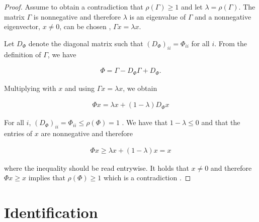 \documentclass[accepted]{uai2021} %
\begin{document}
\begin{proof}
	Assume to obtain a contradiction that $\rho(\Gamma) \geq 1$ and let 
	$\lambda = \rho(\Gamma)$. The matrix $\Gamma$ is nonnegative and therefore 
	$\lambda$ is an eigenvalue of $\Gamma$ and a nonnegative eigenvector, $x 
	\neq 0$, 
	can be chosen \citep[Theorem 8.3.1]{horn1985}, $\Gamma x = \lambda x$.
	
	Let $D_\Phi$ denote the diagonal matrix such that $(D_{\Phi})_{ii} = 
	\Phi_{ii}$ for all $i$. From the definition of $\Gamma$, we have
	
	\begin{align*}
		\Phi= \Gamma - D_\Phi\Gamma + D_\Phi.
	\end{align*}
	
	Multiplying with $x$ and using $\Gamma x = \lambda x$, we obtain
	
	\begin{align*}
		\Phi x = \lambda x + (1- \lambda)D_\Phi x
	\end{align*}
	
	For all $i$, $(D_\Phi)_{ii} = \Phi_{ii}\leq \rho(\Phi) = 1$ 
	\citep[Corollary 
	8.1.20]{horn1985}. We have that $1 - \lambda \leq 0$ and that the entries 
	of $x$ are nonnegative and therefore
	
	\begin{align*}
		\Phi x \geq \lambda x  + (1- \lambda) x = x
	\end{align*}
	
	where the inequality should be read entrywise. It holds that $x \neq 0$ and 
	therefore $\Phi x \geq x$ implies that $\rho(\Phi) \geq 1$ which is a 
	contradiction \citep[Theorem 8.3.2]{horn1985}.
\end{proof}



\section{Identification}
\label{sec:id}
\end{document}
